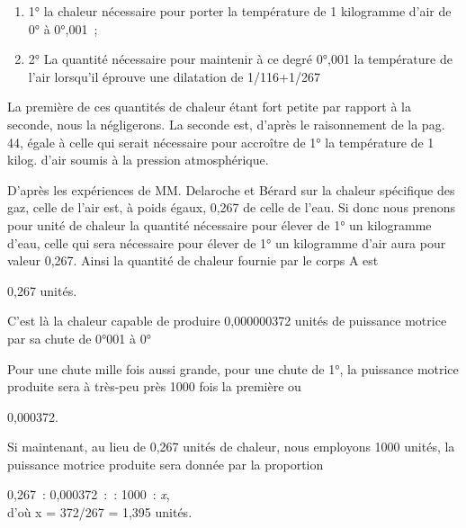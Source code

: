 \documentclass[french,twoside]{book} %
\begin{document}
\begin{enumerate}[itemsep=0pt,topsep=0pt,partopsep=0pt,parskip=0pt]
\item 1° la chaleur nécessaire pour porter la température de 1 kilogramme d’air de 0° à 0°,001 ;
\item 2° La quantité nécessaire pour maintenir à ce degré 0°,001 la température de l’air lorsqu’il éprouve une dilatation de 1/116+1/267
\end{enumerate}

\noindent La première de ces quantités de chaleur étant fort petite par rapport à la seconde, nous la négligerons. La seconde est, d’après le raisonnement de la pag. 44, égale à celle qui serait nécessaire pour accroître de 1° la température de 1 kilog. d’air soumis à la pression atmosphérique.\par
D’après les expériences de MM. Delaroche et Bérard sur la chaleur spécifique des gaz, celle de l’air est, à poids égaux, 0,267 de celle de l’eau. Si donc nous prenons pour unité de chaleur la quantité nécessaire pour élever de 1° un kilogramme d’eau, celle qui sera nécessaire pour élever de 1° un kilogramme d’air aura pour valeur 0,267. Ainsi la quantité de chaleur fournie par le corps A est\par

\begin{center}
0,267 unités.\par
\end{center}

\noindent C’est là la chaleur capable de produire 0,000000372 unités de puissance motrice par sa chute de 0°001 à 0°\par
Pour une chute mille fois aussi grande, pour une chute de 1°, la puissance motrice produite sera à très-peu près 1000 fois la première ou\par

\begin{center}
0,000372.\par
\end{center}

\noindent Si maintenant, au lieu de 0,267 unités de chaleur, nous employons 1000 unités, la puissance motrice produite sera donnée par la proportion\par

\begin{center}
0,267 : 0,000372 : : 1000 : \emph{x}, \\
d’où x = 372/267 = 1,395 unités.\par
\end{center}
\end{document}
